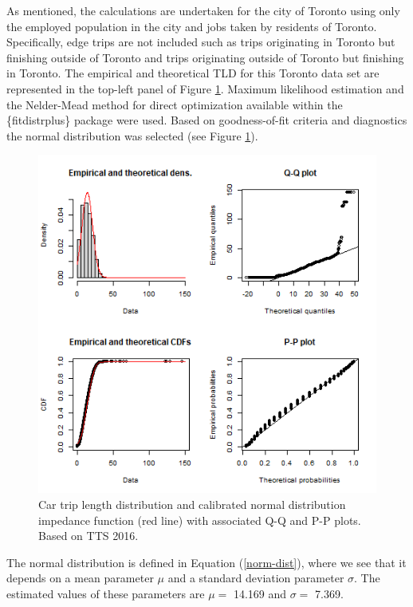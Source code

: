\documentclass[]{elsarticle} %
\begin{document}
As mentioned, the calculations are undertaken for the city of Toronto
using only the employed population in the city and jobs taken by
residents of Toronto. Specifically, edge trips are not included such as
trips originating in Toronto but finishing outside of Toronto and trips
originating outside of Toronto but finishing in Toronto. The empirical
and theoretical TLD for this Toronto data set are represented in the
top-left panel of Figure \ref{fig:TLD-norm-plot}. Maximum likelihood
estimation and the Nelder-Mead method for direct optimization available
within the \{fitdistrplus\} package \citep{fitdistrplus_2015} were used.
Based on goodness-of-fit criteria and diagnostics the normal
distribution was selected (see Figure \ref{fig:TLD-norm-plot}).

\begin{figure}

{\centering \includegraphics[width=1\linewidth]{images/impedance_function} 

}

\caption{\label{fig:TLD-norm-plot}Car trip length distribution and calibrated normal distribution impedance function (red line) with associated Q-Q and P-P plots. Based on TTS 2016.}\label{fig:TLD-norm-plot}
\end{figure}

The normal distribution is defined in Equation (\ref{norm-dist}), where
we see that it depends on a mean parameter \(\mu\) and a standard
deviation parameter \(\sigma\). The estimated values of these parameters
are \(\mu=\) 14.169 and \(\sigma =\) 7.369.
\end{document}
